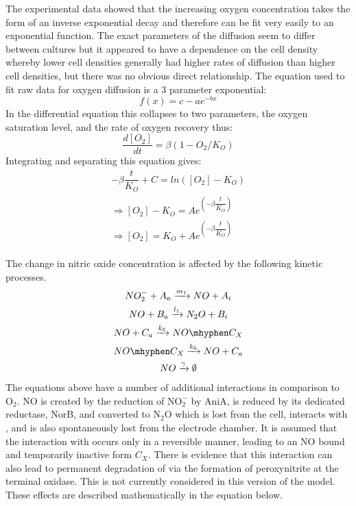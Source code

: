 The experimental data showed that the increasing oxygen concentration takes the form of an inverse exponential decay and therefore can be fit very easily to an exponential function. The exact parameters of the diffusion seem to differ between cultures but it appeared to have a dependence on the cell density whereby lower cell densities generally had higher rates of diffusion than higher cell densities, but there was no obvious direct relationship.
The equation used to fit raw data for oxygen diffusion is a 3 parameter exponential:
\begin{equation*}
f(x) = c - ae^{-bx}
\end{equation*}
In the differential equation this collapses to two parameters, the oxygen saturation level, and the rate of oxygen recovery thus:
\begin{equation*}
\dfrac{d[O_2]}{dt} = \beta(1-O_2/K_O)
\end{equation*}
Integrating and separating this equation gives:
\begin{equation*}
\begin{gathered}
-\beta\dfrac{t}{K_O} + C = ln([O_2]-K_O)\\
\Rightarrow [O_2]-K_O = Ae^{\left(-\beta\dfrac{t}{K_O}\right)}\\
\Rightarrow [O_2] = K_O + Ae^{\left(-\beta\dfrac{t}{K_O}\right)}
\end{gathered}
\end{equation*}
\clearpage
{}\\
The change in nitric oxide concentration is affected by the following kinetic processes.
\begin{equation*}
\begin{gathered}
NO_2^- + A_a \xrightarrow{m_1} NO + A_i\\
NO + B_a \xrightarrow{l_1} N_2O + B_i\\
NO + C_a \xrightarrow{k_5} NO\mhyphen C_X\\
NO\mhyphen C_X \xrightarrow{k_6} NO + C_a\\
NO \xrightarrow{\gamma} \emptyset
\end{gathered}
\end{equation*}
The equations above have a number of additional interactions in comparison to $\mathrm{O}_2$. NO is created by the reduction of $\mathrm{NO}_\mathrm{2}^\mathrm{-}$ by AniA, is reduced by its dedicated reductase, NorB, and converted to $\mathrm{N}_2\mathrm{O}$ which is lost from the cell, interacts with \cbbthree{}, and is also spontaneously lost from the electrode chamber. It is assumed that the interaction with \cbbthree{} occurs only in a reversible manner, leading to an NO bound and temporarily inactive form $C_X$. There is evidence that this interaction can also lead to permanent degradation of \cbbthree{} via the formation of peroxynitrite at the terminal oxidase\cite{Sharpe1998,Blomberg2005}. This is not currently considered in this version of the model. These effects are described mathematically in the equation below.
